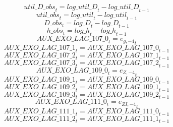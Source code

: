 \begin{dmath}
{util\_D\_obs}_{t}={log\_util\_D}_{t}-{log\_util\_D}_{t-1}
\end{dmath}
\begin{dmath}
{util\_obs}_{t}={log\_util}_{t}-{log\_util}_{t-1}
\end{dmath}
\begin{dmath}
{D\_obs}_{t}={log\_D}_{t}-{log\_D}_{t-1}
\end{dmath}
\begin{dmath}
{h\_obs}_{t}={log\_h}_{t}-{log\_h}_{t-1}
\end{dmath}
\begin{dmath}
{AUX\_EXO\_LAG\_107\_0}_{t}={{e_{g,-4}}}_{t}
\end{dmath}
\begin{dmath}
{AUX\_EXO\_LAG\_107\_1}_{t}={AUX\_EXO\_LAG\_107\_0}_{t-1}
\end{dmath}
\begin{dmath}
{AUX\_EXO\_LAG\_107\_2}_{t}={AUX\_EXO\_LAG\_107\_1}_{t-1}
\end{dmath}
\begin{dmath}
{AUX\_EXO\_LAG\_107\_3}_{t}={AUX\_EXO\_LAG\_107\_2}_{t-1}
\end{dmath}
\begin{dmath}
{AUX\_EXO\_LAG\_109\_0}_{t}={{e_{Z,-4}}}_{t}
\end{dmath}
\begin{dmath}
{AUX\_EXO\_LAG\_109\_1}_{t}={AUX\_EXO\_LAG\_109\_0}_{t-1}
\end{dmath}
\begin{dmath}
{AUX\_EXO\_LAG\_109\_2}_{t}={AUX\_EXO\_LAG\_109\_1}_{t-1}
\end{dmath}
\begin{dmath}
{AUX\_EXO\_LAG\_109\_3}_{t}={AUX\_EXO\_LAG\_109\_2}_{t-1}
\end{dmath}
\begin{dmath}
{AUX\_EXO\_LAG\_111\_0}_{t}={{e_{ZI,-4}}}_{t}
\end{dmath}
\begin{dmath}
{AUX\_EXO\_LAG\_111\_1}_{t}={AUX\_EXO\_LAG\_111\_0}_{t-1}
\end{dmath}
\begin{dmath}
{AUX\_EXO\_LAG\_111\_2}_{t}={AUX\_EXO\_LAG\_111\_1}_{t-1}
\end{dmath}
